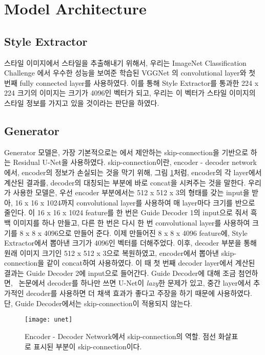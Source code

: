\section{Model Architecture}
\label{sec:archi}

\subsection{Style Extractor}

스타일 이미지에서 스타일을 추출해내기 위해서, 우리는 ImageNet Classification Challenge \cite{Deng2009ImageNet}에서 우수한 성능을 보여준 학습된 VGGNet \cite{Simonyan2014}의 convolutional layer와 첫 번째 fully connected layer를 사용하였다.
이를 통해 Style Extractor를 통과한 224 x 224 크기의 이미지는 크기가 4096인 벡터가 되고, 우리는 이 벡터가 스타일 이미지의 스타일 정보를 가지고 있을 것이라는 판단을 하였다.
\subsection{Generator}

Generator 모델은, 가장 기본적으로는 \stylepaint 에서 제안하는 skip-connection을 기반으로 하는 Residual U-Net을 사용하였다.
skip-connection이란, encoder - decoder network에서, encoder의 정보가 손실되는 것을 막기 위해, 그림 \ref{fig:unet}처럼, encoder의 각 layer에서 계산된 결과를, decoder의 대칭되는 부분에 바로 concat을 시켜주는 것을 말한다.
우리가 사용한 모델은, 우선 encoder 부분에서는 512 x 512 x 3의 형태를 갖는 input을 받아, 16 x 16 x 1024까지 convolutional layer를 사용하여 매 layer마다 크기를 반으로 줄인다.
이 16 x 16 x 1024 feature를 한 번은 Guide Decoder 1의 input으로 줘서 흑백 이미지를 하나 만들고, 다른 한 번은 다시 한 번 convolutional layer를 사용하여 크기를 8 x 8 x 4096으로 만들어 준다.
이제 만들어진 8 x 8 x 4096 feature에, Style Extractor에서 뽑아낸 크기가 4096인 벡터를 더해주었다.
이후, decoder 부분을 통해 원래 이미지 크기인 512 x 512 x 3으로 복원하였고, encoder에서 뽑아낸 skip-connection을 같이 concat하여 사용하였다.
이 때 첫 번째 decoder layer에서 계산된 결과는 Guide Decoder 2에 input으로 들어간다. Guide Decoder에 대해 조금 첨언하면, \stylepaint~논문에서 decoder를 하나만 쓰면 U-Net이 \textit{lazy}한 문제가 있고, 중간 layer에서 추가적인 decoder를 사용하면 더 채색 효과가 좋다고 주장을 하기 때문에 사용하였다.
단, Guide Decoder에서는 skip-connection이 적용되지 않는다.

\begin{figure}[t]
	\centering
	\texttt{[image: unet]}
	\caption{Encoder - Decoder Network에서 skip-connection의 역할. 점선 화살표로 표시된 부분이 skip-connection이다.}
	\label{fig:unet}
\end{figure}


